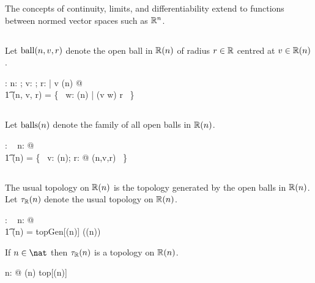 \documentclass[11pt, oneside]{article}
\begin{document}
The concepts of continuity, limits, and differentiability extend to functions between normed vector spaces such as $\mathbb{R}^n$.

\subsection{}

Let $\operatorname{ball}(n,v,r)$ denote the open ball in $\mathbb{R}(n)$ of radius $r  \in \mathbb{R}$ centred at $v \in \mathbb{R}(n)$.

\begin{axdef}
	\ballRn: \nat \cross \Rinf \cross \R \pfun \power \Rinf
\where
	\forall n: \nat; v: \Rinf; r: \R | v \in \Rtuples(n) @ \\
	\t1	\ballRn(n, v, r) = \{~ w: \Rtuples(n) | \normR(v \vsubR w) \ltR r ~\}
\end{axdef}

\subsection{}

Let $\operatorname{balls}(n)$ denote the family of all open balls in $\mathbb{R}(n)$.

\begin{axdef}
	\ballsRn: \nat \fun \family~\Rinf
\where
	\forall n: \nat @ \\
	\t1	\ballsRn(n) =  \{~ v: \Rtuples(n); r: \R @ \ballRn(n,v,r) ~\}
\end{axdef}

\subsection{}

The usual topology on $\mathbb{R}(n)$ is the topology generated by the open balls in $\mathbb{R}(n)$.
Let $\tau_{\mathbb{R}}(n)$ denote the usual topology on $\mathbb{R}(n)$.

\begin{axdef}
	\tauRn: \nat \fun \family~\Rinf
\where
	\forall n: \nat @ \\
	\t1	\tauRn(n) = topGen[\Rtuples(n)] (\ballsRn(n))
\end{axdef}

\begin{remark}

If $n \in \nat$ then $\tau_{\mathbb{R}}(n)$ is a topology on $\mathbb{R}(n)$.

\begin{zed}
	\forall n: \nat @ \tauRn(n) \in top[\Rtuples(n)]
\end{zed}
\end{remark}
\end{document}
